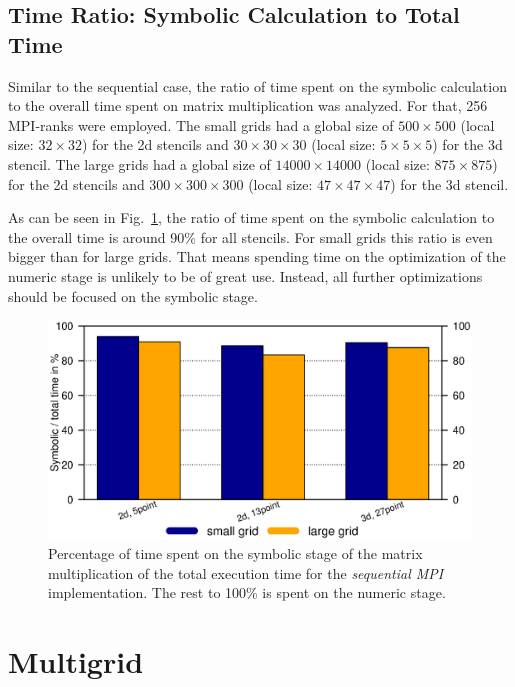 \subsection{Time Ratio: Symbolic Calculation to Total Time}
Similar to the sequential case, the ratio of time spent on the symbolic calculation to the overall time spent on matrix multiplication was analyzed. For that, 256 MPI-ranks were employed. The small grids had a global size of $500\times 500$ (local size: $32\times 32$) for the 2d stencils and $30\times 30 \times 30$ (local size: $5\times 5 \times 5$) for the 3d stencil. The large grids had a global size of $14000\times 14000$ (local size: $875 \times 875$) for the 2d stencils and $300 \times 300 \times 300$ (local size: $47\times 47 \times 47$) for the 3d stencil. 

As can be seen in Fig.~\ref{fig:mpi_symnum}, the ratio of time spent on the symbolic calculation to the overall time is around 90\% for all stencils. For small grids this ratio is even bigger than for large grids. That means spending time on the optimization of the numeric stage is unlikely to be of great use. Instead, all further optimizations should be focused on the symbolic stage. 

\begin{figure}[tbp]
	\centering
	\includegraphics[width=1\textwidth, trim={0 3.cm 0 7cm},clip]{mpi_symnum}
	\caption{Percentage of time spent on the symbolic stage of the matrix multiplication of the total execution time for the \textit{sequential MPI} implementation. The rest to 100\% is spent on the numeric stage.} 
	\label{fig:mpi_symnum}
\end{figure}

\section{Multigrid}

